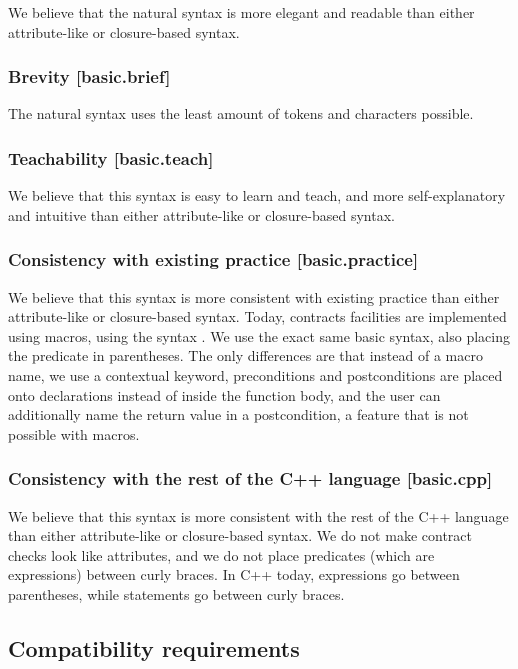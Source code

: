 We believe that the natural syntax is more elegant and readable than either attribute-like or closure-based syntax.

\subsubsection{Brevity  [basic.brief]}

The natural syntax uses the least amount of tokens and characters possible.

\subsubsection{Teachability  [basic.teach]}

We believe that this syntax is easy to learn and teach, and more self-explanatory and intuitive than either attribute-like or closure-based syntax.

\subsubsection{Consistency with existing practice  [basic.practice]}

We believe that this syntax is more consistent with existing practice than either attribute-like or closure-based syntax. Today, contracts facilities are implemented using macros, using the syntax . We use the exact same basic syntax, also placing the predicate in parentheses. The only differences are that instead of a macro name, we use a contextual keyword, preconditions and postconditions are placed onto declarations instead of inside the function body, and the user can additionally name the return value in a postcondition, a feature that is not possible with macros.

\subsubsection{Consistency with the rest of the C++ language  [basic.cpp]}

We believe that this syntax is more consistent with the rest of the C++ language than either attribute-like or closure-based syntax. We do not make contract checks look like attributes, and we do not place predicates (which are expressions) between curly braces. In C++ today, expressions go between parentheses, while statements go between curly braces.

\subsection{Compatibility requirements}

